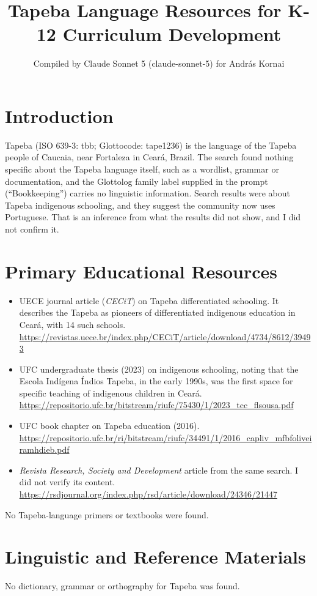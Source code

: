 \documentclass[12pt]{article}
\title{Tapeba Language Resources for K-12 Curriculum Development}
\author{Compiled by Claude Sonnet 5 (claude-sonnet-5) for Andr\'as Kornai}
\date{}
\begin{document}
\maketitle

\section{Introduction}
Tapeba (ISO 639-3: tbb; Glottocode: tape1236) is the language of the Tapeba people of Caucaia, near Fortaleza in Cear\'a, Brazil. The search found nothing specific about the Tapeba language itself, such as a wordlist, grammar or documentation, and the Glottolog family label supplied in the prompt (``Bookkeeping'') carries no linguistic information. Search results were about Tapeba indigenous schooling, and they suggest the community now uses Portuguese. That is an inference from what the results did not show, and I did not confirm it.

\section{Primary Educational Resources}
\begin{itemize}
\item UECE journal article (\emph{CECiT}) on Tapeba differentiated schooling. It describes the Tapeba as pioneers of differentiated indigenous education in Cear\'a, with 14 such schools. \url{https://revistas.uece.br/index.php/CECiT/article/download/4734/8612/39493}
\item UFC undergraduate thesis (2023) on indigenous schooling, noting that the Escola Ind\'igena \'Indios Tapeba, in the early 1990s, was the first space for specific teaching of indigenous children in Cear\'a. \url{https://repositorio.ufc.br/bitstream/riufc/75430/1/2023_tcc_flsousa.pdf}
\item UFC book chapter on Tapeba education (2016). \url{https://repositorio.ufc.br/ri/bitstream/riufc/34491/1/2016_capliv_mfbfoliveiramhdieb.pdf}
\item \emph{Revista Research, Society and Development} article from the same search. I did not verify its content. \url{https://rsdjournal.org/index.php/rsd/article/download/24346/21447}
\end{itemize}
No Tapeba-language primers or textbooks were found.

\section{Linguistic and Reference Materials}
No dictionary, grammar or orthography for Tapeba was found.
\end{document}
